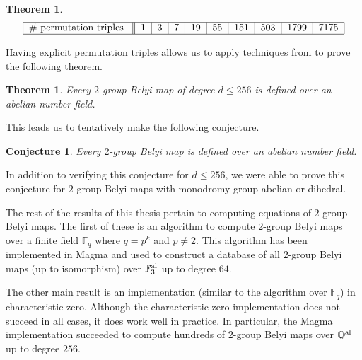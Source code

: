 \documentclass{dcthesis}
\newcommand{\QQal}{{\mathbb Q}^{\textup{al}}}
\newcommand{\FF}{\mathbb{F}}
\numberwithin{equation}{section}
\newtheorem{theorem}[equation]{Theorem}
\newtheorem{conj}[equation]{Conjecture}
\theoremstyle{definition}
\theoremstyle{remark}
\begin{document}
{{{\begin{theorem}
\begin{equation}
\begin{tabular}{|c||c|c|c|c|c|c|c|c|c|}
          \hline
          \#\text{ permutation triples } & $1$ & $3$ & $7$ & $19$ & $55$ & $151$ & $503$ & $1799$ & $7175$\\
          \hline
        \end{tabular}
      \end{equation}
    \end{theorem}
    Having explicit permutation triples
    allows us to apply techniques from
    \cite{belyidb}
    to prove the following theorem.
    \begin{theorem}
      \label{thm:conj_up_to_256_results}
      Every $2$-group Belyi map
      of degree $d\leq 256$ is defined over
      an abelian number field.
    \end{theorem}
    This leads us to tentatively make the
    following conjecture.
    \begin{conj}
      \label{conj:conjecture_results}
      Every $2$-group Belyi map
      is defined over an abelian number field.
    \end{conj}
    In addition to verifying this conjecture
    for $d\leq 256$,
    we were able to prove this conjecture
    for $2$-group Belyi maps
    with monodromy group abelian or dihedral.
    \par
    The rest of the results of this thesis
    pertain to computing equations
    of $2$-group Belyi maps.
    The first of these is an algorithm
    to compute $2$-group Belyi maps
    over a finite field $\FF_q$
    where $q=p^k$ and $p\neq 2$.
    This algorithm has been implemented in
    \textsf{Magma}
    and used to construct a database
    of all $2$-group Belyi maps
    (up to isomorphism)
    over
    $\FF_3^\textup{al}$
    up to degree $64$.
    \par
    The other main result is an implementation
    (similar to the algorithm over 
    $\FF_q$)
    in characteristic zero.
    Although the characteristic zero
    implementation does not succeed in all cases,
    it does work well in practice.
    In particular,
    the \textsf{Magma} implementation succeeded
    to compute hundreds of $2$-group Belyi maps
    over $\QQal$ up to degree $256$.
  }
}}
\end{document}
